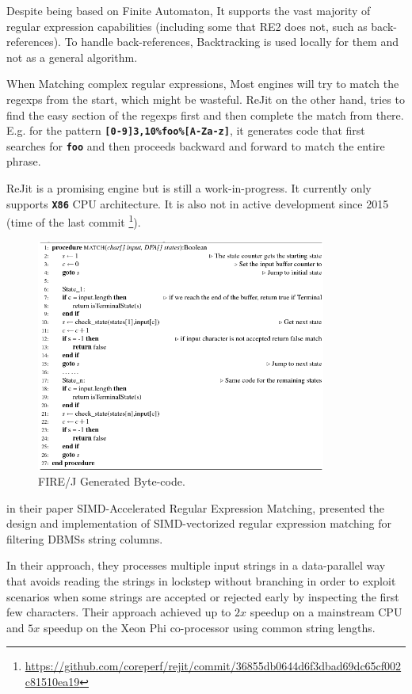 Despite being based on Finite Automaton, It supports the vast majority of regular expression capabilities (including some that RE2 does not, such as back-references). To handle back-references, Backtracking is used locally for them and not as a general algorithm.

When Matching complex regular expressions, Most engines will try to match the regexps from the start, which might be wasteful. ReJit on the other hand, tries to find the easy section of the regexps first and then complete the match from there. E.g. for the pattern \texttt{\textbf{[0-9]{3,10}\%foo\%[A-Za-z]}}, it generates code that first searches for \texttt{\textbf{foo}} and then proceeds backward and forward to match the entire phrase.

ReJit is a promising engine but is still a work-in-progress. It currently only supports \texttt{\textbf{X86}} CPU architecture. It is also not in active development since 2015 (time of the last commit \footnote{\url{https://github.com/coreperf/rejit/commit/36855db0644d6f3dbad69dc65cf002c81510ea19}}).

\begin{figure}[H]
\includegraphics[width=0.85\textwidth]{imgs/alg-byte-firej.png}
\caption{FIRE/J \cite{firejpaper} Generated Byte-code.}\label{fig:firejpaper}
\end{figure}


\citet{simdregextpch} in their paper SIMD-Accelerated Regular Expression Matching, presented the design and implementation of SIMD-vectorized regular expression matching for filtering DBMSs string columns. 

In their approach, they processes multiple input strings in a data-parallel way that avoids reading the strings in lockstep without branching in order to exploit scenarios when some strings are accepted or rejected early by inspecting the first few characters. Their approach achieved up to $2x$ speedup on a mainstream CPU and $5x$ speedup on the Xeon Phi co-processor using common string lengths.


